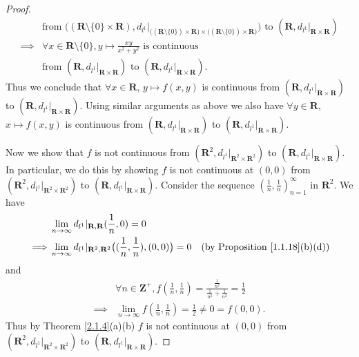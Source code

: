\begin{proof}
\begin{align*}
                 & \text{from } \big((\mathbf{R} \setminus \{0\} \times \mathbf{R}), d_{l^1}|_{\big((\mathbf{R} \setminus \{0\}) \times \mathbf{R}\big) \times \big((\mathbf{R} \setminus \{0\}) \times \mathbf{R}\big)}\big) \text{ to } (\mathbf{R}, d_{l^1}|_{\mathbf{R} \times \mathbf{R}})                                                              \\
        \implies & \forall x \in \mathbf{R} \setminus \{0\}, y \mapsto \frac{xy}{x^2 + y^2} \text{ is continuous}                                                                                                                                                                                                                                            \\
                 & \text{from } (\mathbf{R}, d_{l^1}|_{\mathbf{R} \times \mathbf{R}}) \text{ to } (\mathbf{R}, d_{l^1}|_{\mathbf{R} \times \mathbf{R}}).
    \end{align*}
    Thus we conclude that \(\forall x \in \mathbf{R}\), \(y \mapsto f(x, y)\) is continuous from \((\mathbf{R}, d_{l^1}|_{\mathbf{R} \times \mathbf{R}})\) to \((\mathbf{R}, d_{l^1}|_{\mathbf{R} \times \mathbf{R}})\).
    Using similar arguments as above we also have \(\forall y \in \mathbf{R}\), \(x \mapsto f(x, y)\) is continuous from \((\mathbf{R}, d_{l^1}|_{\mathbf{R} \times \mathbf{R}})\) to \((\mathbf{R}, d_{l^1}|_{\mathbf{R} \times \mathbf{R}})\).

    Now we show that \(f\) is not continuous from \((\mathbf{R}^2, d_{l^1}|_{\mathbf{R}^2 \times \mathbf{R}^2})\) to \((\mathbf{R}, d_{l^1}|_{\mathbf{R} \times \mathbf{R}})\).
    In particular, we do this by showing \(f\) is not continuous at \((0, 0)\) from \((\mathbf{R}^2, d_{l^1}|_{\mathbf{R}^2 \times \mathbf{R}^2})\) to \((\mathbf{R}, d_{l^1}|_{\mathbf{R} \times \mathbf{R}})\).
    Consider the sequence \((\frac{1}{n}, \frac{1}{n})_{n = 1}^\infty\) in \(\mathbf{R}^2\).
    We have
    \begin{align*}
                 & \lim_{n \to \infty} d_{l^1}|_{\mathbf{R}, \mathbf{R}}(\frac{1}{n}, 0) = 0                                                                              \\
        \implies & \lim_{n \to \infty} d_{l^1}|_{\mathbf{R}^2, \mathbf{R}^2}\big((\frac{1}{n}, \frac{1}{n}), (0, 0)\big) = 0 & \text{(by Proposition \ref{1.1.18}(b)(d))}
    \end{align*}
    and
    \begin{align*}
                 & \forall n \in \mathbf{Z}^+, f(\frac{1}{n}, \frac{1}{n}) = \frac{\frac{1}{n^2}}{\frac{1}{n^2} + \frac{1}{n^2}} = \frac{1}{2} \\
        \implies & \lim_{n \to \infty} f(\frac{1}{n}, \frac{1}{n}) = \frac{1}{2} \neq 0 = f(0, 0).
    \end{align*}
    Thus by Theorem \ref{2.1.4}(a)(b) \(f\) is not continuous at \((0, 0)\) from \((\mathbf{R}^2, d_{l^1}|_{\mathbf{R}^2 \times \mathbf{R}^2})\) to \((\mathbf{R}, d_{l^1}|_{\mathbf{R} \times \mathbf{R}})\).
\end{proof}

